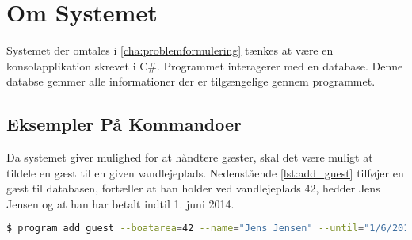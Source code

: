 \section{Om Systemet}
\label{sec:om_systemet}

Systemet der omtales i \cref{cha:problemformulering} tænkes at være en konsolapplikation skrevet i C\#. Programmet interagerer med en database. Denne databse gemmer alle informationer der er tilgængelige gennem programmet.

\subsection{Eksempler På Kommandoer}
\label{sub:eksempler_p_kommandoer}

Da systemet giver mulighed for at håndtere gæster, skal det være muligt at tildele en gæst til en given vandlejeplads. Nedenstående \cref{lst:add_guest} tilføjer en gæst til databasen, fortæller at han holder ved vandlejeplads 42, hedder Jens Jensen og at han har betalt indtil 1. juni 2014.

\begin{lstlisting}[language=bash, label=lst:add_guest] 
  $ program add guest --boatarea=42 --name="Jens Jensen" --until="1/6/2014" 
\end{lstlisting}

